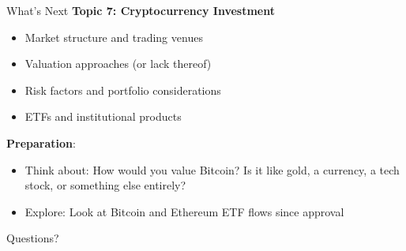 \documentclass[10pt]{beamer}
\begin{document}
\begin{frame}{What's Next}
  \textbf{Topic 7: Cryptocurrency Investment}
  \begin{itemize}
    \item Market structure and trading venues
    \item Valuation approaches (or lack thereof)
    \item Risk factors and portfolio considerations
    \item ETFs and institutional products
  \end{itemize}
  
  \vspace{1em}
  \textbf{Preparation}:
  \begin{itemize}
    \item Think about: How would you value Bitcoin? Is it like gold, a currency, a tech stock, or something else entirely?
    \item Explore: Look at Bitcoin and Ethereum ETF flows since approval
  \end{itemize}
\end{frame}

\begin{frame}[plain]
  \vfill
  \begin{center}
    {\Large Questions?}
  \end{center}
  \vfill
\end{frame}
\end{document}
